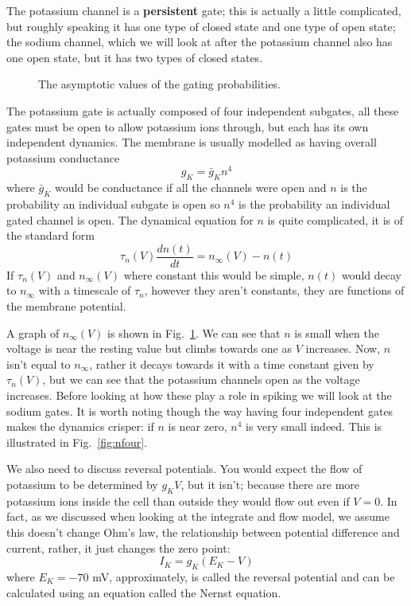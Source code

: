 \documentclass{article}
\begin{document}
The potassium channel is a \textbf{persistent} gate; this is actually
a little complicated, but roughly speaking it has one type of closed
state and one type of open state; the sodium channel, which we will
look at after the potassium channel also has one open state, but it
has two types of closed states. 

\begin{figure}
\begin{center}

\end{center}
\caption{The asymptotic values of the gating probabilities.\label{fig:asymp_vals}}
\end{figure}

The potassium gate is actually composed of four independent subgates,
all these gates must be open to allow potassium ions through, but each
has its own independent dynamics. The membrane is usually modelled as
having overall potassium conductance
\begin{equation}
g_{K}=\bar{g}_Kn^4
\end{equation}
where $\bar{g}_K$ would be conductance if all the channels were open
and $n$ is the probability an individual subgate is open so $n^4$ is
the probability an individual gated channel is open. The dynamical equation for $n$ is quite complicated, it is of the standard form
\begin{equation}
\tau_n(V)\frac{dn(t)}{dt}=n_\infty(V)-n(t)
\end{equation}
If $\tau_n(V)$ and $n_\infty(V)$ where constant this would be simple,
$n(t)$ would decay to $n_\infty$ with a timescale of $\tau_n$, however
they aren't constants, they are functions of the membrane potential. 

A graph of $n_\infty(V)$ is shown in Fig.~\ref{fig:asymp_vals}. We can
see that $n$ is small when the voltage is near the resting value but
climbs towards one as $V$ increases. Now, $n$ isn't equal to
$n_\infty$, rather it decays towards it with a time constant given by
$\tau_n(V)$, but we can see that the potassium channels open as the
voltage increases. Before looking at how these play a role in spiking
we will look at the sodium gates. It is worth noting though the way
having four independent gates makes the dynamics crisper: if $n$ is
near zero, $n^4$ is very small indeed. This is illustrated in
Fig.~\ref{fig:nfour}.

We also need to discuss reversal potentials. You would expect the flow
of potassium to be determined by $g_KV$, but it isn't; because there
are more potassium ions inside the cell than outside they would flow
out even if $V=0$. In fact, as we discussed when looking at the
integrate and flow model, we assume this doesn't change Ohm's law, the
relationship between potential difference and current, rather, it just
changes the zero point:
\begin{equation}
I_K=g_K(E_K-V)
\end{equation}
where $E_K=-70$ mV, approximately, is called the reversal potential
and can be calculated using an equation called the Nernst equation.
\end{document}
